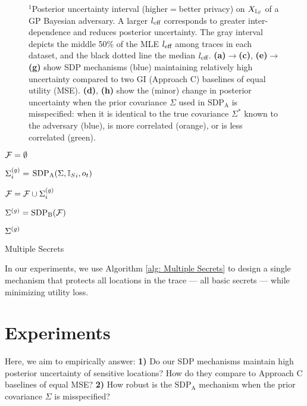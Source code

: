 \begin{figure*}[h]
\begin{subfigure}{.24\linewidth}
    \end{subfigure}
    \caption{$^1$Posterior uncertainty interval (higher$=$better privacy) on ${X_{\mathbb{I}_S}}$ of a GP Bayesian adversary. A larger $l_{\text{eff}}$ corresponds to greater inter-dependence and reduces posterior uncertainty. The gray interval depicts the middle 50\% of the MLE $l_{\text{eff}}$ among traces in each dataset, and the black dotted line the median $l_{\text{eff}}$. \textbf{(a)}$\rightarrow$\textbf{(c)}, \textbf{(e)}$\rightarrow$\textbf{(g)} show SDP mechanisms (blue) maintaining relatively high uncertainty compared to two GI (Approach C) baselines of equal utility (MSE). \textbf{(d)}, \textbf{(h)} show the (minor) change in posterior uncertainty when the prior covariance $\Sigma$  used in $\text{SDP}_{\text{A}}$ is misspecified: when it is identical to the true covariance $\Sigma^*$ known to the adversary (blue), is more correlated (orange), or is less correlated (green).
    }
    \label{fig: experiments}
\end{figure*} 


\begin{algorithm}
		\SetAlgoLined
		\KwOutput{$\Sigmag$}
			\vskip 1mm
			$\mathcal{F} = \emptyset$\;
			
			{
				$\Sigma^{(g)}_i =$ $\text{SDP}_\text{A}(\Sigma, {\mathbb{I}_S}_i, o_t)$\; 
				
				$\mathcal{F} = \mathcal{F} \cup \Sigma^{(g)}_i$\;
			}
			\vskip 1mm
			$\Sigma^{(g)}= \text{SDP}_{\text{B}}(\mathcal{F})$\;
			
			\Return $\Sigmag$\;
		\caption{Multiple Secrets}
\label{alg: Multiple Secrets}
\end{algorithm}
In our experiments, we use Algorithm \ref{alg: Multiple Secrets} to design a single mechanism that protects all locations in the trace --- all basic secrets --- while minimizing utility loss.





\section{Experiments}
\label{sec: experiments}
Here, we aim to empirically answer: \textbf{1)} 
Do our SDP mechanisms maintain high posterior uncertainty of sensitive locations? How do they compare to Approach C baselines of equal MSE? 
\textbf{2)} How robust is the $\text{SDP}_\text{A}$ mechanism when the prior covariance $\Sigma$ is misspecified? 

